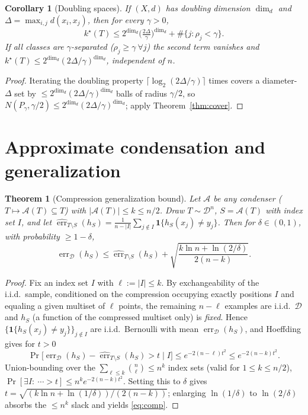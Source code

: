 \documentclass{amsart}
\newtheorem{theorem}{Theorem}
\newtheorem{corollary}{Corollary}
\theoremstyle{definition}
\DeclareMathOperator{\err}{err}
\begin{document}
\begin{corollary}[Doubling spaces]\label{cor:doubling}
If $(X,d)$ has doubling dimension $\dim_d$ and $\Delta=\max_{i,j}d(x_i,x_j)$,
then for every $\gamma>0$,
\[
k^\star(T)\le 2^{\dim_d}\Big(\tfrac{2\Delta}\gamma\Big)^{\dim_d}
+\#\{j:\rho_j<\gamma\}.
\]
If all classes are $\gamma$-separated ($\rho_j\ge\gamma\ \forall j$) the second
term vanishes and $k^\star(T)\le2^{\dim_d}(2\Delta/\gamma)^{\dim_d}$,
\emph{independent of $n$}.
\end{corollary}

\begin{proof}
Iterating the doubling property $\lceil\log_2(2\Delta/\gamma)\rceil$ times
covers a diameter-$\Delta$ set by $\le2^{\dim_d}(2\Delta/\gamma)^{\dim_d}$ balls
of radius $\gamma/2$, so $N(P_\gamma,\gamma/2)\le2^{\dim_d}(2\Delta/\gamma)^{
\dim_d}$; apply Theorem~\ref{thm:cover}.
\end{proof}

\section{Approximate condensation and generalization}\label{sec:gen}

\begin{theorem}[Compression generalization bound]\label{thm:compress}
Let $\mathcal A$ be any condenser ($T\mapsto\mathcal A(T)\subseteq T$) with
$|\mathcal A(T)|\le k\le n/2$. Draw $T\sim\mathcal D^n$, $S=\mathcal A(T)$ with
index set $I$, and let $\widehat{\err}_{T\setminus S}(h_S)=\frac1{n-|I|}
\sum_{j\notin I}\mathbf1\{h_S(x_j)\ne y_j\}$. Then for $\delta\in(0,1)$, with
probability $\ge1-\delta$,
\begin{equation}\label{eq:comp}
\err_\mathcal D(h_S)\le\widehat{\err}_{T\setminus S}(h_S)+
\sqrt{\frac{k\ln n+\ln(2/\delta)}{2(n-k)}} .
\end{equation}
\end{theorem}

\begin{proof}
Fix an index set $I$ with $\ell:=|I|\le k$. By exchangeability of the i.i.d.\
sample, conditioned on the compression occupying exactly positions $I$ and
equaling a given multiset of $\ell$ points, the remaining $n-\ell$ examples are
i.i.d.\ $\mathcal D$ and $h_S$ (a function of the compressed multiset only) is
\emph{fixed}. Hence $\{\mathbf1\{h_S(x_j)\ne y_j\}\}_{j\notin I}$ are i.i.d.\
Bernoulli with mean $\err_\mathcal D(h_S)$, and Hoeffding gives for $t>0$
\[
\Pr\big[\err_\mathcal D(h_S)-\widehat{\err}_{T\setminus S}(h_S)>t\mid I\big]
\le e^{-2(n-\ell)t^2}\le e^{-2(n-k)t^2}.
\]
Union-bounding over the $\sum_{\ell\le k}\binom n\ell\le n^k$ index sets (valid
for $1\le k\le n/2$),
$\Pr[\exists I:\ \cdots>t]\le n^k e^{-2(n-k)t^2}$. Setting this to $\delta$
gives $t=\sqrt{(k\ln n+\ln(1/\delta))/(2(n-k))}$; enlarging $\ln(1/\delta)$ to
$\ln(2/\delta)$ absorbs the $\le n^k$ slack and yields \eqref{eq:comp}.
\end{proof}
\end{document}
